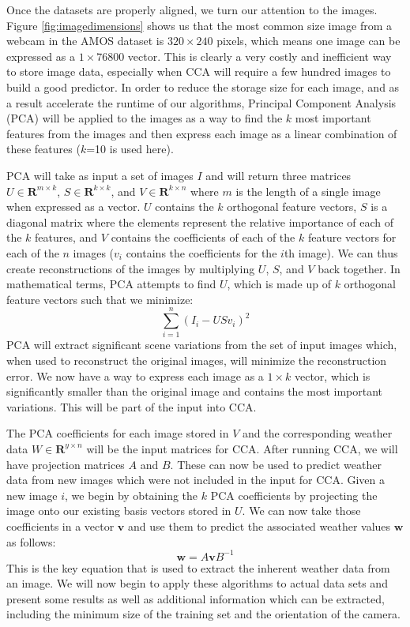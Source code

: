 Once the datasets are properly aligned, we turn our attention to the images. Figure \ref{fig:imagedimensions} shows us that the most common size image from a webcam in the AMOS dataset is $320\times 240$ pixels, which means one image can be expressed as a $1\times 76800$ vector. This is clearly a very costly and inefficient way to store image data, especially when CCA will require a few hundred images to build a good predictor. In order to reduce the storage size for each image, and as a result accelerate the runtime of our algorithms, Principal Component Analysis (PCA) will be applied to the images as a way to find the $k$ most important features from the images and then express each image as a linear combination of these features ($k$=10 is used here). 

PCA will take as input a set of images $I$ and will return three matrices $U\in \mathbf{R}^{m\times k}$, $S\in \mathbf{R}^{k\times k}$, and $V\in \mathbf{R}^{k\times n}$ where $m$ is the length of a single image when expressed as a vector. $U$ contains the $k$ orthogonal feature vectors, $S$ is a diagonal matrix where the elements represent the relative importance of each of the $k$ features, and $V$ contains the coefficients of each of the $k$ feature vectors for each of the $n$ images ($v_i$ contains the coefficients for the $i$th image). We can thus create reconstructions of the images by multiplying $U$, $S$, and $V$ back together. In mathematical terms, PCA attempts to find $U$, which is made up of $k$ orthogonal feature vectors such that we minimize:
\begin{equation}\sum_{i=1}^{n}{\left(I_i - USv_i\right)^2}\label{eq:pca}\end{equation}
PCA will extract significant scene variations from the set of input images which, when used to reconstruct the original images, will minimize the reconstruction error. We now have a way to express each image as a $1\times k$ vector, which is significantly smaller than the original image and contains the most important variations. This will be part of the input into CCA.

The PCA coefficients for each image stored in $V$ and the corresponding weather data $W \in \mathbf{R}^{y\times n}$ will be the input matrices for CCA. After running CCA, we will have projection matrices $A$ and $B$. These can now be used to predict weather data from new images which were not included in the input for CCA. Given a new image $i$, we begin by obtaining the $k$ PCA coefficients by projecting the image onto our existing basis vectors stored in $U$. We can now take those coefficients in a vector $\mathbf{v}$ and use them to predict the associated weather values $\mathbf{w}$ as follows:
\begin{equation}\label{eq:predict}\mathbf{w}=A\mathbf{v}B^{-1}\end{equation}
This is the key equation that is used to extract the inherent weather data from an image. We will now begin to apply these algorithms to actual data sets and present some results as well as additional information which can be extracted, including the minimum size of the training set and the orientation of the camera.


